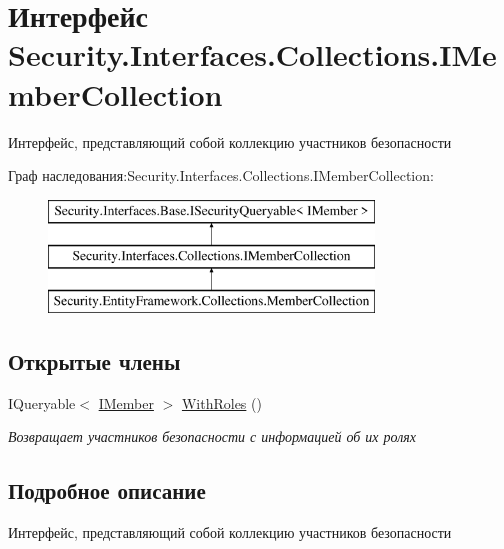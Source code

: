 \hypertarget{interface_security_1_1_interfaces_1_1_collections_1_1_i_member_collection}{}\section{Интерфейс Security.\+Interfaces.\+Collections.\+I\+Member\+Collection}
\label{interface_security_1_1_interfaces_1_1_collections_1_1_i_member_collection}


Интерфейс, представляющий собой коллекцию участников безопасности  


Граф наследования\+:Security.\+Interfaces.\+Collections.\+I\+Member\+Collection\+:\begin{figure}[H]
\begin{center}
\leavevmode
\includegraphics[height=3.000000cm]{d2/da0/interface_security_1_1_interfaces_1_1_collections_1_1_i_member_collection}
\end{center}
\end{figure}
\subsection*{Открытые члены}
\begin{DoxyCompactItemize}
\item 
I\+Queryable$<$ \hyperlink{interface_security_1_1_interfaces_1_1_model_1_1_i_member}{I\+Member} $>$ \hyperlink{interface_security_1_1_interfaces_1_1_collections_1_1_i_member_collection_a3252217f6eba5387ead1faff427bb43a}{With\+Roles} ()
\begin{DoxyCompactList}\small\item\em Возвращает участников безопасности с информацией об их ролях \end{DoxyCompactList}\end{DoxyCompactItemize}


\subsection{Подробное описание}
Интерфейс, представляющий собой коллекцию участников безопасности 



